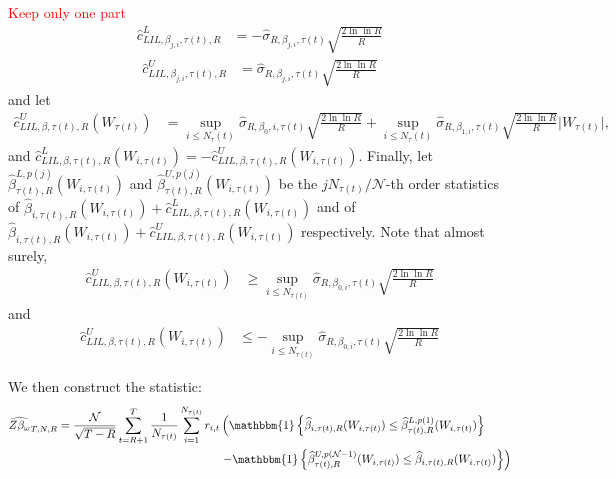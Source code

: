 \textcolor{red}{Keep only one part}
\begin{align}
\widehat{c}_{LIL,\beta_{j,i},\tau(t),R}^L &= - \widehat{\sigma}_{R,\beta_{j,i},\tau(t)} \sqrt{\frac{2 \ln \ln R}{R}}
\end{align}
\begin{align}
\widehat{c}_{LIL,\beta_{j,i},\tau(t),R}^U &= \widehat{\sigma}_{R,\beta_{j,i},\tau(t)} \sqrt{\frac{2 \ln \ln R}{R}}
\end{align}
and let
\begin{align}
\widehat{c}_{LIL,\beta,\tau(t),R}^U (W_{\tau(t)}) &= \sup_{i \leq N_\tau(t)} \widehat{\sigma}_{R,\beta_{0},i,\tau(t)} \sqrt{\frac{2 \ln \ln R}{R}} + \sup_{i \leq N_\tau(t)} \widehat{\sigma}_{R,\beta_{1,i},\tau(t)} \sqrt{\frac{2 \ln \ln R}{R}} \lvert W_{\tau(t)} \rvert,
\end{align}
and $\widehat{c}_{LIL,\beta,\tau(t),R}^L (W_{i,\tau(t)}) = - \widehat{c}_{LIL,\beta,\tau(t),R}^U (W_{i,\tau(t)})$. Finally, let $\widehat{\beta}^{L,p(j)}_{\tau(t),R} (W_{i,\tau(t)})$ and $\widehat{\beta}^{U,p(j)}_{\tau(t),R} (W_{i,\tau(t)})$ be the $j N_{\tau(t)} / \mathcal{N}$-th order statistics of $\widehat{\beta}_{i,\tau(t),R} (W_{i,\tau(t)}) + \widehat{c}_{LIL,\beta,\tau(t),R}^L (W_{i,\tau(t)})$ and of $\widehat{\beta}_{i,\tau(t),R} (W_{i,\tau(t)}) + \widehat{c}_{LIL,\beta,\tau(t),R}^U (W_{i,\tau(t)})$ respectively. Note that almost surely,
\begin{align}
\widehat{c}^{U}_{LIL,\beta,\tau(t),R} (W_{i,\tau(t)}) &\geq \sup_{i \leq N_{\tau(t)}} \widehat{\sigma}_{R,\beta_{0,i},\tau(t)} \sqrt{\frac{2 \ln \ln R}{R}}
\end{align}
and
\begin{align}
\widehat{c}^{U}_{LIL,\beta,\tau(t),R} (W_{i,\tau(t)}) &\leq - \sup_{i \leq N_{\tau(t)}} \widehat{\sigma}_{R,\beta_{0,i},\tau(t)} \sqrt{\frac{2 \ln \ln R}{R}}
\end{align}

We then construct the statistic:
\begin{align}
\widehat{Z \beta_\omega}_{T,N,R} = \frac{\mathcal{N}}{\sqrt{T - R}} \sum_{t=R+1}^{T} \frac{1}{N_{\tau(t)}} \sum_{i=1}^{N_{\tau(t)}} r_{i,t} & \left(\mathbbm{1} \left\{ \widehat{\beta}_{i, \tau(t), R} (W_{i,\tau(t)}) \leq \widehat{\beta}_{\tau(t), R}^{L,p(1)} (W_{i,\tau(t)}) \right\} \right. \\
& \left. - \mathbbm{1} \left\{ \widehat{\beta}_{\tau(t), R}^{U, p(\mathcal{N}-1)} (W_{i,\tau(t)}) \leq \widehat{\beta}_{i, \tau(t), R}(W_{i,\tau(t)})  \right\} \right) \notag
\end{align}

